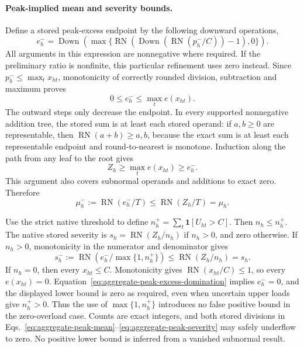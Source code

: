 \documentclass[11pt]{article}
\begin{document}
\paragraph{Peak-implied mean and severity bounds.}
Define a stored peak-excess endpoint by the following downward operations,
\begin{equation}
e_h^-=\operatorname{Down}\!\left(\max\{\operatorname{RN}(\operatorname{Down}(\operatorname{RN}(p_h^-/C))-1),0\}\right).
\label{eq:aggregate-peak-excess}
\end{equation}
All arguments in this expression are nonnegative where required. If the preliminary ratio is nonfinite, this particular refinement uses zero instead. Since $p_h^-\le\max_tx_{ht}$, monotonicity of correctly rounded division, subtraction and maximum proves
\begin{equation}
0\le e_h^-\le\max_te(x_{ht}).
\label{eq:aggregate-peak-excess-domination}
\end{equation}
The outward steps only decrease the endpoint. In every supported nonnegative addition tree, the stored sum is at least each stored operand: if $a,b\ge0$ are representable, then $\operatorname{RN}(a+b)\ge a,b$, because the exact sum is at least each representable endpoint and round-to-nearest is monotone. Induction along the path from any leaf to the root gives
\begin{equation}
Z_h\ge\max_te(x_{ht})\ge e_h^-.
\label{eq:aggregate-timefold-dominates-peak}
\end{equation}
This argument also covers subnormal operands and additions to exact zero. Therefore
\begin{equation}
\mu_h^-:=\operatorname{RN}(e_h^-/T)\le\operatorname{RN}(Z_h/T)=\mu_h.
\label{eq:aggregate-peak-mean}
\end{equation}

Use the strict native threshold to define $n_h^+=\sum_t\mathbf 1[U_{ht}>C]$. Then $n_h\le n_h^+$. The native stored severity is $s_h=\operatorname{RN}(Z_h/n_h)$ if $n_h>0$, and zero otherwise. If $n_h>0$, monotonicity in the numerator and denominator gives
\begin{equation}
s_h^-:=\operatorname{RN}\!\left(e_h^-/\max\{1,n_h^+\}\right)\le\operatorname{RN}(Z_h/n_h)=s_h.
\label{eq:aggregate-peak-severity}
\end{equation}
If $n_h=0$, then every $x_{ht}\le C$. Monotonicity gives $\operatorname{RN}(x_{ht}/C)\le1$, so every $e(x_{ht})=0$. Equation~\eqref{eq:aggregate-peak-excess-domination} implies $e_h^-=0$, and the displayed lower bound is zero as required, even when uncertain upper loads give $n_h^+>0$. Thus the use of $\max\{1,n_h^+\}$ introduces no false positive bound in the zero-overload case. Counts are exact integers, and both stored divisions in Eqs.~\eqref{eq:aggregate-peak-mean}--\eqref{eq:aggregate-peak-severity} may safely underflow to zero. No positive lower bound is inferred from a vanished subnormal result.
\end{document}
